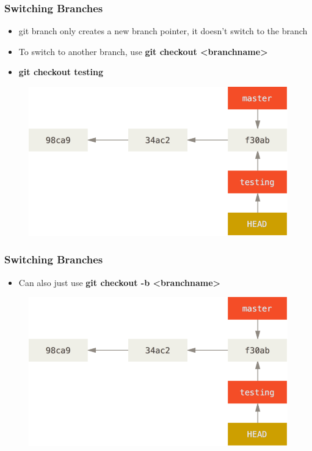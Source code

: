 \documentclass{beamer}
\begin{document}
\begin{frame}
	\frametitle{Switching Branches}
	\begin{itemize}
		\item{git branch only creates a new branch pointer, it doesn't switch to the branch}
		\item{To switch to another branch, use \textbf{git checkout \textless{}branchname\textgreater{}}}
		\item{\textbf{git checkout testing}}
	\end{itemize}
	\begin{figure}
		\includegraphics[scale=0.32]{Switching_Branches-1.png}
	\end{figure}
\end{frame}

\begin{frame}
	\frametitle{Switching Branches}
	\begin{itemize}
		\item{Can also just use  \textbf{git checkout -b \textless{}branchname\textgreater{}}}
	\end{itemize}
	\begin{figure}
		\includegraphics[scale=0.32]{Switching_Branches-1.png}
	\end{figure}
\end{frame}
\end{document}
